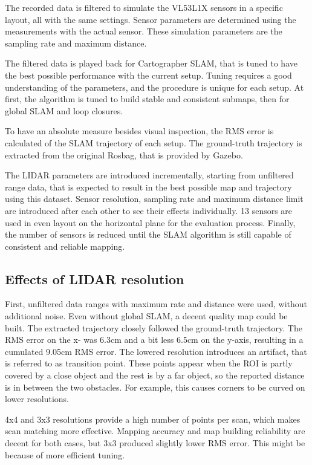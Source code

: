 \documentclass[conference]{IEEEtran}
\begin{document}
The recorded data is filtered to simulate the VL53L1X sensors in a specific layout, all with the same settings. 
Sensor parameters are determined using the measurements with the actual sensor. These simulation parameters are
the sampling rate and maximum distance. 

The filtered data is played back for Cartographer SLAM, that is tuned to have the best possible performance
with the current setup. Tuning requires a good understanding of the parameters, and the procedure is unique for
each setup. At first, the algorithm is tuned to build stable and consistent submaps, then for global SLAM and
loop closures.

To have an absolute measure besides visual inspection, the RMS error is calculated of the SLAM trajectory of 
each setup. The ground-truth trajectory is extracted from the original Rosbag, that is provided by Gazebo.

 
The LIDAR parameters are introduced incrementally, starting from unfiltered range data, that is expected to 
result in the best possible map and trajectory using this dataset. Sensor resolution, sampling rate and 
maximum distance limit are introduced after each other to see their effects individually. 13 sensors are used
in even layout on the horizontal plane for the evaluation process. Finally, the number of sensors is reduced
until the SLAM algorithm is still capable of consistent and reliable mapping.

\subsection{Effects of LIDAR resolution}

First, unfiltered data ranges with maximum rate and distance were used, without additional noise.
Even without global SLAM, a decent quality map could be built. The extracted trajectory closely followed 
the ground-truth trajectory. The RMS error on the x- was 6.3cm and a bit less 6.5cm on the y-axis, resulting 
in a cumulated 9.05cm RMS error. The lowered resolution introduces an artifact, that is referred to as transition
point. These points appear when the ROI is partly covered by a close object and the rest is by a far object, so 
the reported distance is in between the two obstacles. For example, this causes corners to be curved on lower 
resolutions.

4x4 and 3x3 resolutions provide a high number of points per scan, which makes scan matching more effective. 
Mapping accuracy and map building reliability are decent for both cases, but 3x3 produced slightly lower RMS error.
This might be because of more efficient tuning. 
\end{document}
